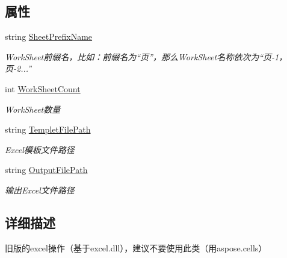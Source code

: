 \subsection*{属性}
\begin{DoxyCompactItemize}
\item 
string \hyperlink{class_x_c_l_net_tools_1_1_office_1_1_excel_handler_1_1_excel_helper_afa37d1f7b1b3cbb06dcacffc908fbcb6}{Sheet\+Prefix\+Name}
\begin{DoxyCompactList}\small\item\em Work\+Sheet前缀名，比如：前缀名为“页”，那么\+Work\+Sheet名称依次为“页-\/1，页-\/2...” \end{DoxyCompactList}\item 
int \hyperlink{class_x_c_l_net_tools_1_1_office_1_1_excel_handler_1_1_excel_helper_a2354740ddfdb8dbef974f91258c672e0}{Work\+Sheet\+Count}
\begin{DoxyCompactList}\small\item\em Work\+Sheet数量 \end{DoxyCompactList}\item 
string \hyperlink{class_x_c_l_net_tools_1_1_office_1_1_excel_handler_1_1_excel_helper_a5ea43ea5bce7424c7ad90335ddeb09bd}{Templet\+File\+Path}
\begin{DoxyCompactList}\small\item\em Excel模板文件路径 \end{DoxyCompactList}\item 
string \hyperlink{class_x_c_l_net_tools_1_1_office_1_1_excel_handler_1_1_excel_helper_a208fdf6acc1a32a42377d798020aeee3}{Output\+File\+Path}
\begin{DoxyCompactList}\small\item\em 输出\+Excel文件路径 \end{DoxyCompactList}\end{DoxyCompactItemize}


\subsection{详细描述}
旧版的excel操作（基于excel.\+dll），建议不要使用此类（用aspose.\+cells） 



